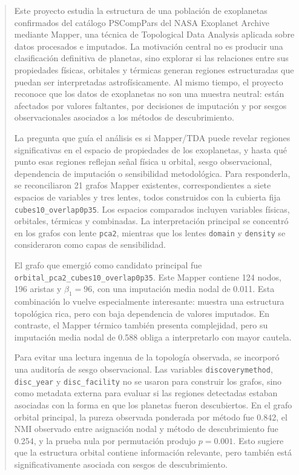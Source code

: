 \begin{abstract}


Este proyecto estudia la estructura de una población de exoplanetas confirmados del catálogo PSCompPars del NASA Exoplanet Archive mediante Mapper, una técnica de Topological Data Analysis aplicada sobre datos procesados e imputados. La motivación central no es producir una clasificación definitiva de planetas, sino explorar si las relaciones entre sus propiedades físicas, orbitales y térmicas generan regiones estructuradas que puedan ser interpretadas astrofísicamente. Al mismo tiempo, el proyecto reconoce que los datos de exoplanetas no son una muestra neutral: están afectados por valores faltantes, por decisiones de imputación y por sesgos observacionales asociados a los métodos de descubrimiento.

La pregunta que guía el análisis es si Mapper/TDA puede revelar regiones significativas en el espacio de propiedades de los exoplanetas, y hasta qué punto esas regiones reflejan señal física u orbital, sesgo observacional, dependencia de imputación o sensibilidad metodológica. Para responderla, se reconciliaron 21 grafos Mapper existentes, correspondientes a siete espacios de variables y tres lentes, todos construidos con la cubierta fija \texttt{cubes10\_overlap0p35}. Los espacios comparados incluyen variables físicas, orbitales, térmicas y combinadas. La interpretación principal se concentró en los grafos con lente \texttt{pca2}, mientras que los lentes \texttt{domain} y \texttt{density} se consideraron como capas de sensibilidad.

El grafo que emergió como candidato principal fue \texttt{orbital\_pca2\_cubes10\_overlap0p35}. Este Mapper contiene 124 nodos, 196 aristas y $\beta_1=96$, con una imputación media nodal de 0.011. Esta combinación lo vuelve especialmente interesante: muestra una estructura topológica rica, pero con baja dependencia de valores imputados. En contraste, el Mapper térmico también presenta complejidad, pero su imputación media nodal de 0.588 obliga a interpretarlo con mayor cautela.

Para evitar una lectura ingenua de la topología observada, se incorporó una auditoría de sesgo observacional. Las variables \texttt{discoverymethod}, \texttt{disc\_year} y \texttt{disc\_facility} no se usaron para construir los grafos, sino como metadata externa para evaluar si las regiones detectadas estaban asociadas con la forma en que los planetas fueron descubiertos. En el grafo orbital principal, la pureza observada ponderada por método fue 0.842, el NMI observado entre asignación nodal y método de descubrimiento fue 0.254, y la prueba nula por permutación produjo $p=0.001$. Esto sugiere que la estructura orbital contiene información relevante, pero también está significativamente asociada con sesgos de descubrimiento.


\end{abstract}
